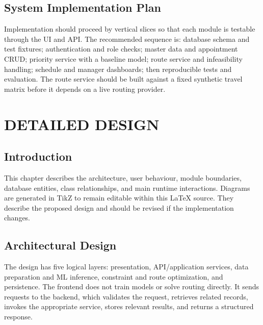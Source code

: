 \documentclass[12pt,a4paper,oneside]{report}
\begin{document}
\section{System Implementation Plan}
Implementation should proceed by vertical slices so that each module is testable through the UI and API. The recommended sequence is: database schema and test fixtures; authentication and role checks; master data and appointment CRUD; priority service with a baseline model; route service and infeasibility handling; schedule and manager dashboards; then reproducible tests and evaluation. The route service should be built against a fixed synthetic travel matrix before it depends on a live routing provider.

\chapter{DETAILED DESIGN}

\section{Introduction}
This chapter describes the architecture, user behaviour, module boundaries, database entities, class relationships, and main runtime interactions. Diagrams are generated in TikZ to remain editable within this LaTeX source. They describe the proposed design and should be revised if the implementation changes.

\section{Architectural Design}
The design has five logical layers: presentation, API/application services, data preparation and ML inference, constraint and route optimization, and persistence. The frontend does not train models or solve routing directly. It sends requests to the backend, which validates the request, retrieves related records, invokes the appropriate service, stores relevant results, and returns a structured response.
\end{document}
